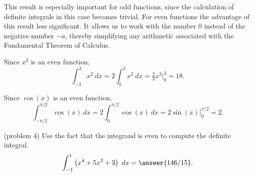 \documentclass{ximera}
\begin{document}
\begin{image}
\end{image}


This result is especially important for odd functions, since the calculation of definite integrals in this case
becomes trivial. For even functions the advantage of this result less significant.  It allows us to work with the number
$0$ instead of the negative number $-a$, thereby simplifying any arithmetic associated with the 
Fundamental Theorem of Calculus.

\begin{example}[example 3]
Since $x^2$ is an even function, 
\[\int_{-3}^3 x^2 \ dx = 2\int_0^3 x^2 \ dx = \tfrac{2}{3}x^3\Bigg|_0^3 = 18.\]
\end{example}

\begin{example}[example 4]
Since $\cos(x)$ is an even function, 
\[\int_{-\pi/2}^{\pi/2} \cos(x) \ dx = 2\int_0^{\pi/2} \cos(x) \ dx = 2\sin(x)\Bigg|_0^{\pi/2} = 2.\]
\end{example}

\begin{problem}(problem 4)
Use the fact that the integrand is even to compute the definite integral.
\[\int_{-1}^1 \left(x^4 + 5x^2 + 3 \right) \ dx =\answer {146/15}.\]
\end{problem}
\end{document}
